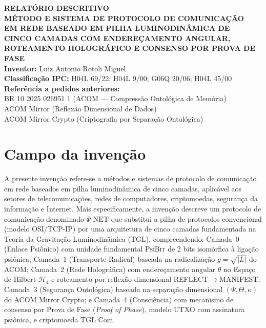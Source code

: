 \documentclass[12pt,a4paper]{article}
\newcommand{\Hfour}{\mathcal{H}_4}
\newcommand{\PsiBit}{\textsc{PsiBit}}
\newcommand{\PsiNet}{\Psi\text{-NET}}
\begin{document}
\begin{center}
{\Large\bfseries RELATÓRIO DESCRITIVO}\\[0.8cm]
{\large\bfseries MÉTODO E SISTEMA DE PROTOCOLO DE COMUNICAÇÃO\\
EM REDE BASEADO EM PILHA LUMINODINÂMICA DE\\
CINCO CAMADAS COM ENDEREÇAMENTO ANGULAR,\\
ROTEAMENTO HOLOGRÁFICO E CONSENSO POR PROVA DE FASE}\\[0.8cm]
\textbf{Inventor:} Luiz Antonio Rotoli Miguel\\[0.3cm]
\textbf{Classificação IPC:} H04L 69/22; H04L 9/00; G06Q 20/06; H04L 45/00\\[0.3cm]
\textbf{Referência a pedidos anteriores:}\\
BR 10 2025 026951 1 (ACOM --- Compressão Ontológica de Memória)\\
ACOM Mirror (Reflexão Dimensional de Dados)\\
ACOM Mirror Crypto (Criptografia por Separação Ontológica)
\end{center}

\vspace{1cm}

\section{Campo da invenção}

A presente invenção refere-se a métodos e sistemas de protocolo
de comunicação em rede baseados em pilha luminodinâmica de cinco
camadas, aplicável aos setores de telecomunicações, redes de
computadores, criptomoedas, segurança da informação e Internet.
Mais especificamente, a invenção descreve um protocolo de
comunicação denominado $\PsiNet$ que substitui a pilha de
protocolos convencional (modelo OSI/TCP-IP) por uma arquitetura
de cinco camadas fundamentada na Teoria da Gravitação
Luminodinâmica (TGL), compreendendo: Camada~0 (Enlace Psiônico)
com unidade fundamental \PsiBit{} de 2 bits isomórfica à
ligação psiônica; Camada~1 (Transporte Radical) baseada na
radicalização $g = \sqrt{|L|}$ do ACOM; Camada~2 (Rede
Holográfica) com endereçamento angular $\theta$ no Espaço de
Hilbert $\Hfour$ e roteamento por reflexão dimensional
REFLECT$\to$MANIFEST; Camada~3 (Segurança Ontológica) baseada
na separação dimensional $({\Psi}, {\Theta}, {\kappa})$ do
ACOM Mirror Crypto; e Camada~4 (Consciência) com mecanismo de
consenso por Prova de Fase (\textit{Proof of Phase}), modelo
UTXO com assinatura psiônica, e criptomoeda TGL Coin.
\end{document}
